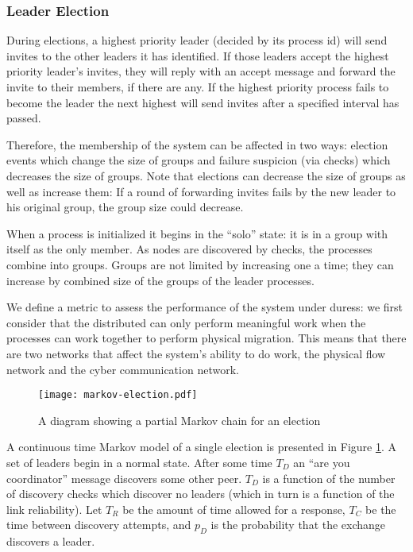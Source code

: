 \subsubsection{Leader Election}
During elections, a highest priority leader (decided by its process id) will send invites to the other leaders it has identified. If those leaders accept the highest priority leader's invites, they will reply with an accept message and forward the invite to their members, if there are any. If the highest priority process fails to become the leader the next highest will send invites after a specified interval has passed.

Therefore, the membership of the system can be affected in two ways: election events which change the size of groups and failure suspicion (via checks) which decreases the size of groups. Note that elections can decrease the size of groups as well as increase them: If a round of forwarding invites fails by the new leader to his original group, the group size could decrease.

When a process is initialized it begins in the ``solo'' state: it is in a group with itself as the only member. As nodes are discovered by checks, the processes combine into groups. Groups are not limited by increasing one a time; they can increase by combined size of the groups of the leader processes.

We define a metric to assess the performance of the system under duress: we first consider that the distributed can only perform meaningful work when the processes can work together to perform physical migration. This means that there are two networks that affect the system's ability to do work, the physical flow network and the cyber communication network.

\begin{figure}[!h]
\centering
\texttt{[image: markov-election.pdf]}
\caption{A diagram showing a partial Markov chain for an election}
\label{fig:MARKOVELECTION}
\end{figure}

A continuous time Markov model of a single election is presented in Figure \ref{fig:MARKOVELECTION}.
A set of leaders begin in a normal state. After some time $T_{D}$ an ``are you coordinator'' message discovers some other peer. $T_{D}$ is a function of the number of discovery checks which discover no leaders (which in turn is a function of the link reliability). Let $T_{R}$ be the amount of time allowed for a response, $T_{C}$ be the time between discovery attempts, and $p_{D}$ is the probability that the exchange discovers a leader.

